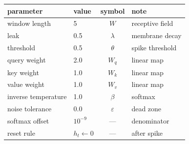 \begingroup\setlength{\tabcolsep}{8pt}\small\begin{tabular}{@{}llcl@{}}
\toprule
parameter & value & symbol & note \\
\midrule
window length & 5 & $W$ & receptive field \\
leak & 0.5 & $\lambda$ & membrane decay \\
threshold & 0.5 & $\theta$ & spike threshold \\
query weight & 2.0 & $W_q$ & linear map \\
key weight & 1.0 & $W_k$ & linear map \\
value weight & 1.0 & $W_v$ & linear map \\
inverse temperature & 1.0 & $\beta$ & softmax \\
noise tolerance & 0.0 & $\varepsilon$ & dead zone \\
softmax offset & $10^{-9}$ & --- & denominator \\
reset rule & $h_t\!\leftarrow\!0$ & --- & after spike \\
\bottomrule
\end{tabular}\endgroup
